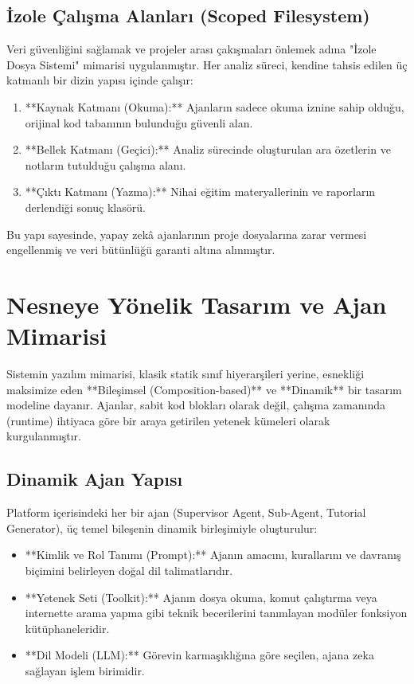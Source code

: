 \subsection{İzole Çalışma Alanları (Scoped Filesystem)}
Veri güvenliğini sağlamak ve projeler arası çakışmaları önlemek adına "İzole Dosya Sistemi" mimarisi uygulanmıştır. Her analiz süreci, kendine tahsis edilen üç katmanlı bir dizin yapısı içinde çalışır:

\begin{enumerate}
    \item **Kaynak Katmanı (Okuma):** Ajanların sadece okuma iznine sahip olduğu, orijinal kod tabanının bulunduğu güvenli alan.
    \item **Bellek Katmanı (Geçici):** Analiz sürecinde oluşturulan ara özetlerin ve notların tutulduğu çalışma alanı.
    \item **Çıktı Katmanı (Yazma):** Nihai eğitim materyallerinin ve raporların derlendiği sonuç klasörü.
\end{enumerate}

Bu yapı sayesinde, yapay zekâ ajanlarının proje dosyalarına zarar vermesi engellenmiş ve veri bütünlüğü garanti altına alınmıştır.

\section{Nesneye Yönelik Tasarım ve Ajan Mimarisi}
\label{sec:ajan-mimarisi}

Sistemin yazılım mimarisi, klasik statik sınıf hiyerarşileri yerine, esnekliği maksimize eden **Bileşimsel (Composition-based)** ve **Dinamik** bir tasarım modeline dayanır. Ajanlar, sabit kod blokları olarak değil, çalışma zamanında (runtime) ihtiyaca göre bir araya getirilen yetenek kümeleri olarak kurgulanmıştır.

\subsection{Dinamik Ajan Yapısı}
Platform içerisindeki her bir ajan (Supervisor Agent, Sub-Agent, Tutorial Generator), üç temel bileşenin dinamik birleşimiyle oluşturulur:

\begin{itemize}
    \item **Kimlik ve Rol Tanımı (Prompt):** Ajanın amacını, kurallarını ve davranış biçimini belirleyen doğal dil talimatlarıdır.
    \item **Yetenek Seti (Toolkit):** Ajanın dosya okuma, komut çalıştırma veya internette arama yapma gibi teknik becerilerini tanımlayan modüler fonksiyon kütüphaneleridir.
    \item **Dil Modeli (LLM):** Görevin karmaşıklığına göre seçilen, ajana zeka sağlayan işlem birimidir.
\end{itemize}

